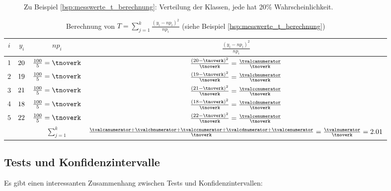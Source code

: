 {\begin{figure}
    \centering
    \begin{tikzpicture}
    \end{tikzpicture}
    \caption{Zu Beispiel \ref{bsp:messwerte_t_berechnung}: Verteilung der Klassen, jede hat 20\% Wahrscheinlichkeit.}
    \label{fig:classes}
\end{figure}

\begin{table}
    \centering
    \begin{tabular}{|c|c|c|c|}
        \hline
        $i$ & $y_i$ & $np_i$ & $\frac{(y_i-np_i)^2}{np_i}$\\
        \hline
        $1$ & $\numca$ & $\frac{\valn}{\valk}=\tnoverk$ & $\frac{(\numca-\tnoverk)^2}{\tnoverk}=\frac{\tvalcanumerator}{\tnoverk}$ \\
        \hline
        $2$ & $\numcb$ & $\frac{\valn}{\valk}=\tnoverk$ & $\frac{(\numcb-\tnoverk)^2}{\tnoverk}=\frac{\tvalcbnumerator}{\tnoverk}$ \\
        \hline
        $3$ & $\numcc$ & $\frac{\valn}{\valk}=\tnoverk$ & $\frac{(\numcc-\tnoverk)^2}{\tnoverk}=\frac{\tvalccnumerator}{\tnoverk}$ \\
        \hline
        $4$ & $\numcd$ & $\frac{\valn}{\valk}=\tnoverk$ & $\frac{(\numcd-\tnoverk)^2}{\tnoverk}=\frac{\tvalcdnumerator}{\tnoverk}$ \\
        \hline
        $5$ & $\numce$ & $\frac{\valn}{\valk}=\tnoverk$ & $\frac{(\numce-\tnoverk)^2}{\tnoverk}=\frac{\tvalcenumerator}{\tnoverk}$ \\
        \hline
        & & $\sum_{j=1}^k$ & $\frac{\tvalcanumerator+\tvalcbnumerator+\tvalccnumerator+\tvalcdnumerator+\tvalcenumerator}{\tnoverk}=\frac{\tvalnumerator}{\tnoverk}=\tval$\\
        \hline
    \end{tabular}
    \caption{Berechnung von $T=\sum_{j=1}^k\frac{(y_i-np_i)^2}{np_i}$ (siehe Beispiel \ref{bsp:messwerte_t_berechnung})}\label{tab:messwerte_t_berechnung}
\end{table}
}

\ifdefined\uebsps

\fi
{}
\subsection{Tests und Konfidenzintervalle}
Es gibt einen interessanten Zusammenhang zwischen Tests und Konfidenzintervallen:

